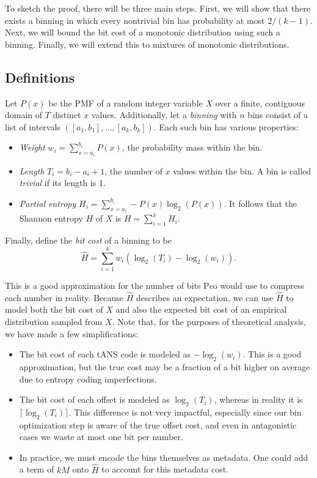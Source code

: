 \documentclass[letterpaper]{article}
\begin{document}
To sketch the proof, there will be three main steps.
First, we will show that there exists a binning in which every nontrivial bin has probability at most $2/(k-1)$.
Next, we will bound the bit cost of a monotonic distribution using such a binning.
Finally, we will extend this to mixtures of monotonic distributions.

\subsection{Definitions}

Let $P(x)$ be the PMF of a random integer variable $X$ over a finite, contiguous domain of $T$ distinct $x$ values.
Additionally, let a \emph{binning} with $n$ bins consist of a list of intervals $([a_1, b_1], \ldots, [a_k, b_k])$.
Each such bin has various properties:
\begin{itemize}
  \item \emph{Weight} $w_i = \sum_{x=a_i}^{b_i}P(x)$, the probability mass within the bin.
  \item \emph{Length} $T_i = b_i - a_i + 1$, the number of $x$ values within the bin. A bin is called \emph{trivial} if its length is 1.
  \item \emph{Partial entropy} $H_i = \sum_{x=a_i}^{b_i}-P(x)\log_2(P(x))$.
    It follows that the Shannon entropy $H$ of $X$ is $H = \sum_{i=1}^k H_i$.
\end{itemize}

Finally, define the \emph{bit cost} of a binning to be
\begin{equation}
  \hat{H} = \sum_{i=1}^k w_i(\log_2(T_i) - \log_2(w_i)).
  \label{eq:bit_cost}
\end{equation}

This is a good approximation for the number of bits Pco would use to compress each number in reality.
Because $\hat{H}$ describes an expectation, we can use $\hat{H}$ to model both the bit cost of $X$ and also the expected bit cost of an empirical distribution sampled from $X$.
Note that, for the purposes of theoretical analysis, we have made a few simplifications:
\begin{itemize}
  \item The bit cost of each tANS code is modeled as $-\log_2(w_i)$.
    This is a good approximation, but the true cost may be a fraction of a bit higher on average due to entropy coding imperfections.
  \item The bit cost of each offset is modeled as $\log_2(T_i)$, whereas in reality it is $\lceil\log_2(T_i)\rceil$.
    This difference is not very impactful, especially since our bin optimization step is aware of the true offset cost, and even in antagonistic cases we waste at most one bit per number.
  \item In practice, we must encode the bins themselves as metadata.
    One could add a term of $kM$ onto $\hat{H}$ to account for this metadata cost.
\end{itemize}
\end{document}
